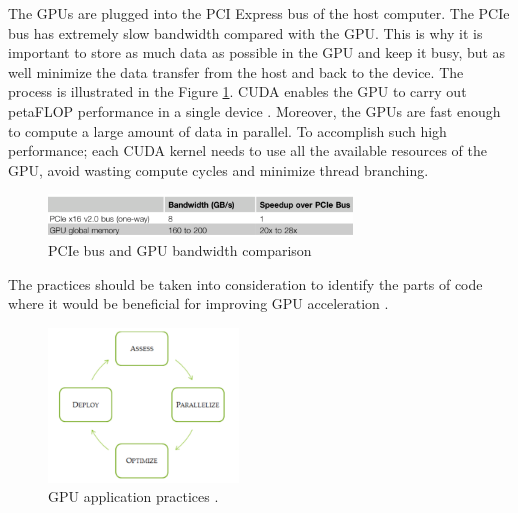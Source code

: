 The GPUs are plugged into the PCI Express bus of the host computer. The PCIe bus has extremely slow bandwidth compared with the GPU. This is why it is important to store as much data as possible in the GPU and keep it busy, but as well minimize the data transfer from the host and back to the device. The process is illustrated in the Figure \ref{fig:PCI}. CUDA enables the GPU to carry out petaFLOP performance in a single device \cite{cook}. Moreover, the GPUs are fast enough to compute a large amount of data in parallel. To accomplish such high performance; each CUDA kernel needs to use all the available resources of the GPU, avoid wasting compute cycles and minimize thread branching.

\begin{figure}[htbp]
	\centering
		\includegraphics[width=0.72\textwidth]{Figures/PCI.png}
		\smallskip
	\caption[PCIe bus bandwidth]{PCIe bus and GPU bandwidth comparison \cite{cook}}
	\label{fig:PCI}
\end{figure}

The practices should be taken into consideration to identify the parts of code where it would be beneficial for improving GPU acceleration \cite{practices}.

\begin{figure}[htbp]
	\centering
		\includegraphics[width=0.45\textwidth]{Figures/apod.png}
		\smallskip
	\caption[GPU application practices]{GPU application practices \cite{practices}.}
	\label{fig:apod}
\end{figure}


